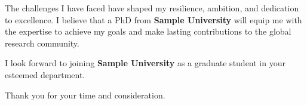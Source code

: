 \documentclass[11pt]{article}
\newif\ifshowsections
\begin{document}
\ifshowsections\section*{Conclusion}\fi

The challenges I have faced have shaped my resilience, ambition, and dedication to excellence. I believe that a
PhD from \textbf{Sample University} will equip me with the expertise to achieve my goals and make lasting
contributions to the global research community.

I look forward to joining \textbf{Sample University} as a graduate student in your esteemed department.

\begin{flushleft}
    \hspace{2em}Thank you for your time and consideration.
\end{flushleft}
\end{document}
